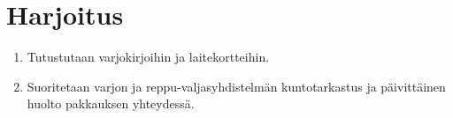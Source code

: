 \section{ Harjoitus }
\label{kaluston-tarkastus-ja-huolto-harjoitus}

\begin{enumerate}[label=\bfseries \arabic*)]
\item  Tutustutaan varjokirjoihin ja laitekortteihin. 
\item  Suoritetaan varjon ja reppu-valjasyhdistelmän kuntotarkastus ja päivittäinen huolto pakkauksen yhteydessä. 
\end{enumerate}

